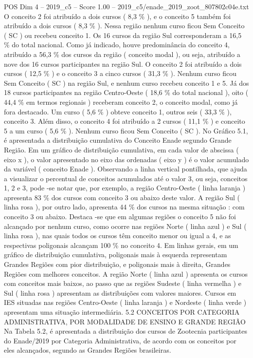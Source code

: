 \begin{textsample}{POS Dim 4 – 2019\_c5 – Score 1.00 – 2019\_c5/enade\_2019\_zoot\_807802c04e.txt}
O conceito 2 foi atribuído a dois cursos ( 8,3 \% ), e o conceito 5 também foi atribuído a dois cursos ( 8,3 \% ).
Nessa região nenhum curso ficou Sem Conceito ( SC ) ou recebeu conceito 1.
Os 16 cursos da região Sul corresponderam a 16,5 \% do total nacional.
Como já indicado, houve predominância do conceito 4, atribuído a 56,3 \% dos cursos da região ( conceito modal ), ou seja, atribuído a nove dos 16 cursos participantes na região Sul.
O conceito 2 foi atribuído a dois cursos ( 12,5 \% ) e o conceito 3 a cinco cursos ( 31,3 \% ).
Nenhum curso ficou Sem Conceito ( SC ) na região Sul, e nenhum curso recebeu conceito 1 e 5.
Já dos 18 cursos participantes na região Centro-Oeste ( 18,6 \% do total nacional ), oito ( 44,4 \% em termos regionais ) receberam conceito 2, o conceito modal, como já fora destacado.
Um curso ( 5,6 \% ) obteve conceito 1, outros seis ( 33,3 \% ), conceito 3.
Além disso, o conceito 4 foi atribuído a 2 cursos ( 11,1 \% ) e conceito 5 a um curso ( 5,6 \% ).
Nenhum curso ficou Sem Conceito ( SC ).
No Gráfico 5.1, é apresentada a distribuição cumulativa do Conceito Enade segundo Grande Região.
Em um gráfico de distribuição cumulativa, em cada valor de abscissa ( eixo x ), o valor apresentado no eixo das ordenadas ( eixo y ) é o valor acumulado da variável ( conceito Enade ).
Observando a linha vertical pontilhada, que ajuda a visualizar o percentual de conceitos acumulados até o valor 3, ou seja, conceitos 1, 2 e 3, pode -se notar que, por exemplo, a região Centro-Oeste ( linha laranja ) apresenta 83 \% dos cursos com conceito 3 ou abaixo deste valor.
A região Sul ( linha rosa ), por outro lado, apresenta 44 \% dos cursos na mesma situação : com conceito 3 ou abaixo.
Destaca -se que em algumas regiões o conceito 5 não foi alcançado por nenhum curso, como ocorre nas regiões Norte ( linha azul ) e Sul ( linha rosa ), nas quais todos os cursos têm conceito menor ou igual a 4, e as respectivas poligonais alcançam 100 \% no conceito 4.
Em linhas gerais, em um gráfico de distribuição cumulativa, poligonais mais à esquerda representam Grandes Regiões com pior distribuição, e poligonais mais à direita, Grandes Regiões com melhores conceitos.
A região Norte ( linha azul ) apresenta os cursos com conceitos mais baixos, ao passo que as regiões Sudeste ( linha vermelha ) e Sul ( linha rosa ) apresentam as distribuições com valores maiores.
Cursos em IES situadas nas regiões Centro-Oeste ( linha laranja ) e Nordeste ( linha verde ) apresentam uma situação intermediária. 5.2 CONCEITOS POR CATEGORIA ADMINISTRATIVA, POR MODALIDADE DE ENSINO E GRANDE REGIÃO Na Tabela 5.2, é apresentada a distribuição dos cursos de Zootecnia participantes do Enade/2019 por Categoria Administrativa, de acordo com os conceitos por eles alcançados, segundo as Grandes Regiões brasileiras.

\end{textsample}
